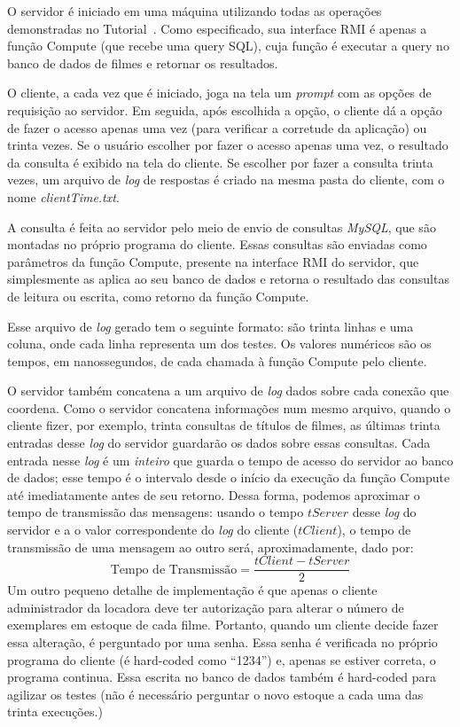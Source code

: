 \documentclass[12pt,a4paper]{article}
\begin{document}
O servidor é iniciado em uma máquina utilizando todas as operações demonstradas no Tutorial~\cite{RMITutorial}. Como especificado, sua interface RMI é apenas a função Compute (que recebe uma query SQL), cuja função é executar a query no banco de dados de filmes e retornar os resultados.

O cliente, a cada vez que é iniciado, joga na tela um {\it prompt} com as opções de requisição ao servidor. Em seguida, após escolhida a opção, o cliente dá a opção de fazer o acesso apenas uma vez (para verificar a corretude da aplicação) ou trinta vezes. Se o usuário escolher por fazer o acesso apenas uma vez, o resultado da consulta é exibido na tela do cliente. Se escolher por fazer a consulta trinta vezes, um arquivo de {\it log} de respostas é criado na mesma pasta do cliente, com o nome {\it clientTime.txt}.

A consulta é feita ao servidor pelo meio de envio de consultas {\it MySQL}, que são montadas no próprio programa do cliente. Essas consultas são enviadas como parâmetros da função Compute, presente na interface RMI do servidor, que simplesmente as aplica ao seu banco de dados e retorna o resultado das consultas de leitura ou escrita, como retorno da função Compute.

Esse arquivo de {\it log} gerado tem o seguinte formato: são trinta linhas e uma coluna, onde cada linha representa um dos testes. Os valores numéricos são os tempos, em nanossegundos, de cada chamada à função Compute pelo cliente.

O servidor também concatena a um arquivo de {\it log} dados sobre cada conexão que coordena. Como o servidor concatena informações num mesmo arquivo, quando o cliente fizer, por exemplo, trinta consultas de títulos de filmes, as últimas trinta entradas desse {\it log} do servidor guardarão os dados sobre essas consultas. Cada entrada nesse {\it log} é um {\it inteiro} que guarda o tempo de acesso do servidor ao banco de dados; esse tempo é o intervalo desde o início da execução da função Compute até imediatamente antes de seu retorno. Dessa forma, podemos aproximar o tempo de transmissão das mensagens: usando o tempo $ tServer $ desse {\it log} do servidor e a o valor correspondente do {\it log} do cliente ($ tClient $), o tempo de transmissão de uma mensagem ao outro será, aproximadamente, dado por:
\begin{equation}
{\text {Tempo de Transmissão}} = \frac{tClient - tServer}{2}
\label{eqn:time}
\end{equation}
Um outro pequeno detalhe de implementação é que apenas o cliente administrador da locadora deve ter autorização para alterar o número de exemplares em estoque de cada filme. Portanto, quando um cliente decide fazer essa alteração, é perguntado por uma senha. Essa senha é verificada no próprio programa do cliente (é hard-coded como “1234”) e, apenas se estiver correta, o programa continua. Essa escrita no banco de dados também é hard-coded para agilizar os testes (não é necessário perguntar o novo estoque a cada uma das trinta execuções.)
\end{document}
